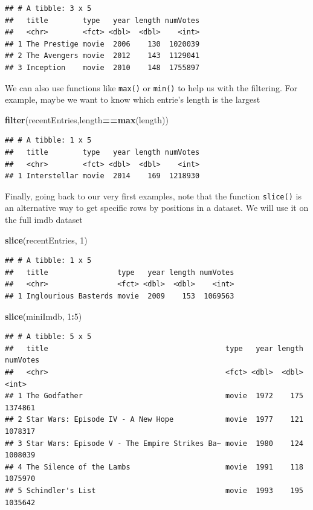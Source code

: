 \documentclass[]{book}
\newenvironment{Shaded}{\begin{snugshade}}{\end{snugshade}}
\newcommand{\DecValTok}[1]{\textcolor[rgb]{0.00,0.00,0.81}{#1}}
\newcommand{\KeywordTok}[1]{\textcolor[rgb]{0.13,0.29,0.53}{\textbf{#1}}}
\newcommand{\NormalTok}[1]{#1}
\newcommand{\OperatorTok}[1]{\textcolor[rgb]{0.81,0.36,0.00}{\textbf{#1}}}
\begin{document}
\begin{verbatim}
## # A tibble: 3 x 5
##   title        type   year length numVotes
##   <chr>        <fct> <dbl>  <dbl>    <int>
## 1 The Prestige movie  2006    130  1020039
## 2 The Avengers movie  2012    143  1129041
## 3 Inception    movie  2010    148  1755897
\end{verbatim}

We can also use functions like \texttt{max()} or \texttt{min()} to help us with the filtering. For example, maybe we want to know which entrie's length is the largest

\begin{Shaded}
\begin{Highlighting}[]
\KeywordTok{filter}\NormalTok{(recentEntries,length}\OperatorTok{==}\KeywordTok{max}\NormalTok{(length))}
\end{Highlighting}
\end{Shaded}

\begin{verbatim}
## # A tibble: 1 x 5
##   title        type   year length numVotes
##   <chr>        <fct> <dbl>  <dbl>    <int>
## 1 Interstellar movie  2014    169  1218930
\end{verbatim}

Finally, going back to our very first examples, note that the function \texttt{slice()} is an alternative way to get specific rows by positions in a dataset. We will use it on the full imdb dataset

\begin{Shaded}
\begin{Highlighting}[]
\KeywordTok{slice}\NormalTok{(recentEntries, }\DecValTok{1}\NormalTok{)}
\end{Highlighting}
\end{Shaded}

\begin{verbatim}
## # A tibble: 1 x 5
##   title                type   year length numVotes
##   <chr>                <fct> <dbl>  <dbl>    <int>
## 1 Inglourious Basterds movie  2009    153  1069563
\end{verbatim}

\begin{Shaded}
\begin{Highlighting}[]
\KeywordTok{slice}\NormalTok{(miniImdb, }\DecValTok{1}\OperatorTok{:}\DecValTok{5}\NormalTok{)}
\end{Highlighting}
\end{Shaded}

\begin{verbatim}
## # A tibble: 5 x 5
##   title                                         type   year length numVotes
##   <chr>                                         <fct> <dbl>  <dbl>    <int>
## 1 The Godfather                                 movie  1972    175  1374861
## 2 Star Wars: Episode IV - A New Hope            movie  1977    121  1078317
## 3 Star Wars: Episode V - The Empire Strikes Ba~ movie  1980    124  1008039
## 4 The Silence of the Lambs                      movie  1991    118  1075970
## 5 Schindler's List                              movie  1993    195  1035642
\end{verbatim}
\end{document}
